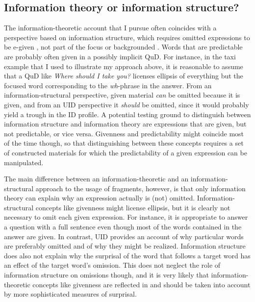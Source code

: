 \subsection{Information theory or information structure?}
The information-theoretic account that I pursue often coincides with a perspective based on information structure, which requires omitted expressions to be e-given \citep{merchant2004}, not part of the focus \citep{reich2007} or backgrounded \citep{ott.struckmeier2016}. Words that are predictable are probably often given in a possibly implicit QuD. For instance, in the taxi example that I used to illustrate my approach above, it is reasonable to assume that a QuD like \textit{Where should I take you?} licenses ellipsis of everything but the focused word corresponding to the \textit{wh}-phrase in the answer. From an information-structural perspective, given material \textit{can} be omitted because it is given, and from an UID perspective it \textit{should} be omitted, since it would probably yield a trough in the ID profile. A potential testing ground to distinguish between information structure and information theory are expressions that are given, but not predictable, or vice versa. Givenness and predictability might coincide most of the time though, so that distinguishing between these concepts requires a set of constructed materials for which the predictability of a given expression can be manipulated.

The main difference between an information-theoretic and an information-structural approach to the usage of fragments, however, is that only information theory can  explain why an expression actually is (not) omitted. Information-structural concepts like givenness might license ellipsis, but it is clearly not necessary to omit each given expression. For instance, it is appropriate to answer a question with a full sentence even though most of the words contained in the answer are given. In contrast, UID provides an account of why particular words are preferably omitted and of why they might be realized. Information structure does also not explain why the surprisal of the word that follows a target word has an effect of the target word's omission. This does not neglect the role of information structure on omissions though, and it is very likely that information-theoretic concepts like givenness are reflected in and should be taken into account by more sophisticated measures of surprisal.


